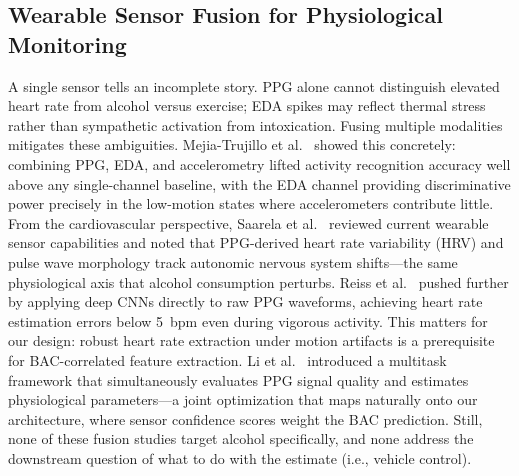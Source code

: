 \documentclass[HARVARD,Times2COL]{WileyNJDv5} %
\begin{document}
\subsection{Wearable Sensor Fusion for Physiological Monitoring}
A single sensor tells an incomplete story. PPG alone cannot distinguish elevated heart rate from alcohol versus exercise; EDA spikes may reflect thermal stress rather than sympathetic activation from intoxication. Fusing multiple modalities mitigates these ambiguities. Mejia-Trujillo et al.~\citep{mejia2024} showed this concretely: combining PPG, EDA, and accelerometry lifted activity recognition accuracy well above any single-channel baseline, with the EDA channel providing discriminative power precisely in the low-motion states where accelerometers contribute little.
From the cardiovascular perspective, Saarela et al.~\citep{saarela2025} reviewed current wearable sensor capabilities and noted that PPG-derived heart rate variability (HRV) and pulse wave morphology track autonomic nervous system shifts---the same physiological axis that alcohol consumption perturbs. Reiss et al.~\citep{reiss2019} pushed further by applying deep CNNs directly to raw PPG waveforms, achieving heart rate estimation errors below 5~bpm even during vigorous activity. This matters for our design: robust heart rate extraction under motion artifacts is a prerequisite for BAC-correlated feature extraction.
Li et al.~\citep{li2025multitask} introduced a multitask framework that simultaneously evaluates PPG signal quality and estimates physiological parameters---a joint optimization that maps naturally onto our architecture, where sensor confidence scores weight the BAC prediction. Still, none of these fusion studies target alcohol specifically, and none address the downstream question of what to do with the estimate (i.e., vehicle control).
\end{document}
